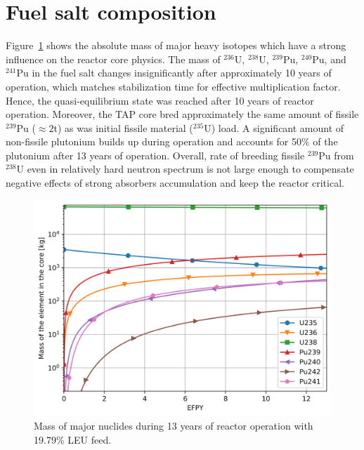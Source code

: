 \documentclass[12pt]{article} %
\begin{document}
\section{Fuel salt composition}
Figure~\ref{fig:u-pu} shows the absolute mass of major heavy isotopes 
which have a strong influence on the reactor core physics. The mass of 
$^{236}$U, $^{238}$U, $^{239}$Pu, $^{240}$Pu, and $^{241}$Pu in the 
fuel salt changes insignificantly after approximately 10 years of operation,
which matches stabilization time for effective multiplication factor. 
Hence, the quasi-equilibrium state was reached after 10 years of reactor 
operation. Moreover, the \gls{TAP} core bred approximately the same amount 
of fissile $^{239}$Pu ($\approx2$t) as was initial fissile material 
($^{235}$U) load. A significant amount of non-fissile plutonium builds 
up during operation and accounts for 50\% of the plutonium after 13 years 
of operation. Overall, rate of breeding fissile $^{239}$Pu from $^{238}$U 
even in relatively hard neutron spectrum is not large enough to compensate 
negative effects of strong absorbers accumulation and keep the reactor 
critical.
\begin{figure}[htp!] %
  \centering
		  \includegraphics[width=1.03\textwidth]{u_pu_mass.png}
	 \vspace{-0.4in}
  \caption{Mass of major nuclides during 13 years of reactor operation 
  with 19.79\% \gls{LEU} feed.}
  \label{fig:u-pu}
\end{figure}
\end{document}
